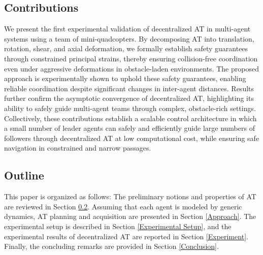 \documentclass[journal]{IEEEtran}
\theoremstyle{definition}
\theoremstyle{plain}
\begin{document}
\subsection{Contributions}

We present the first experimental validation of decentralized AT in multi-agent systems using a team of mini-quadcopters. By decomposing AT into translation, rotation, shear, and axial deformation, we formally establish safety guarantees through constrained principal strains, thereby ensuring collision-free coordination even under aggressive deformations in obstacle-laden environments. The proposed approach is experimentally shown to uphold these safety guarantees, enabling reliable coordination despite significant changes in inter-agent distances. Results further confirm the asymptotic convergence of decentralized AT, highlighting its ability to safely guide multi-agent teams through complex, obstacle-rich settings. Collectively, these contributions establish a scalable control architecture in which a small number of leader agents can safely and efficiently guide large numbers of followers through decentralized AT at low computational cost, while ensuring safe navigation in constrained and narrow passages.







\subsection{Outline}\label{sec:outline}
This paper is organized as follows: The preliminary notions and properties of AT are reviewed in Section \ref{sec:outline}. Assuming that each agent is modeled by generic dynamics, AT planning and acquisition are presented in Section \ref{Approach}. The experimental setup is described in Section \ref{Experimental Setup}, and the experimental results of decentralized AT are reported in Section \ref{Experiment}. Finally, the concluding remarks are provided in Section \ref{Conclusion}.
\end{document}
